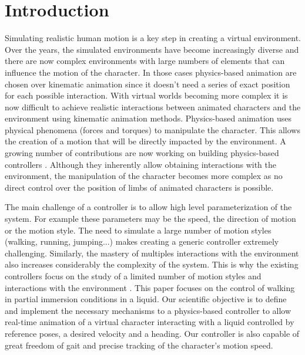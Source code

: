 \documentclass[conference]{acmsiggraph}
\begin{document}
\keywordlist




\copyrightspace

\section{Introduction}

Simulating realistic human motion is a key step in creating a virtual environment. Over the years, the simulated environments have become increasingly diverse and there are now complex environments with large numbers of elements that can influence the motion of the character. In those cases physics-based animation are chosen over kinematic animation since it doesn't need a series of exact position for each possible interaction. With virtual worlds becoming more complex it is now difficult to achieve realistic interactions between animated characters and the environment using kinematic animation methods. Physics-based animation uses physical phenomena (forces and torques) to manipulate the character. This allows the creation of a motion that will be directly impacted by the environment. A growing number of contributions are now working on building physics-based controllers \cite{geijtenbeek2012interactive}. Although they inherently allow obtaining interactions with the environment, the manipulation of the character becomes more complex as no direct control over the position of limbs of animated characters is possible.

The main challenge of a controller is to allow high level parameterization of the system. For example these parameters may be the speed, the direction of motion or the motion style. The need to simulate a large number of motion styles (walking, running, jumping...) makes creating a generic controller extremely challenging. Similarly, the mastery of multiples interactions with the environment also increases considerably the complexity of the system. This is why the existing controllers focus on the study of a limited number of motion styles and interactions with the environment \cite{geijtenbeek2012interactive}. This paper focuses on the control of walking in partial immersion conditions in a liquid. Our scientific objective is to define and implement the necessary mechanisms to a physics-based controller to allow real-time animation of a virtual character interacting with a liquid controlled by reference poses, a desired velocity and a heading. Our controller is also capable of great freedom of gait and precise tracking of the character's motion speed.
\end{document}
